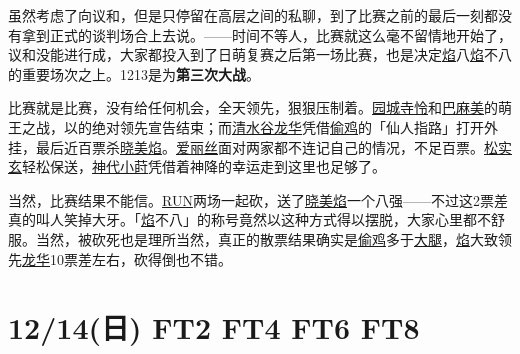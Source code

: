 
虽然考虑了向议和，但是只停留在高层之间的私聊，到了比赛之前的最后一刻都没有拿到正式的谈判场合上去说。——时间不等人，比赛就这么毫不留情地开始了，议和没能进行成，大家都投入到了日萌复赛之后第一场比赛，也是决定\uline{焰}八\uline{焰}不八的重要场次之上。1213是为\textbf{第三次大战}。

比赛就是比赛，没有给任何机会，全天领先，狠狠压制着。\uline{园城寺怜}和\uline{巴麻美}的萌王之战，以的绝对领先宣告结束；而\uline{清水谷龙华}凭借\uline{偷鸡}的「仙人指路」打开外挂，最后近百票杀\uline{晓美焰}。\uline{爱丽丝}面对两家都不连记自己的情况，不足百票。\uline{松实玄}轻松保送，\uline{神代小莳}凭借着神降的幸运走到这里也足够了。

当然，比赛结果不能信。\uline{RUN}两场一起砍，送了\uline{晓美焰}一个八强——不过这2票差真的叫人笑掉大牙。「\uline{焰}不八」的称号竟然以这种方式得以摆脱，大家心里都不舒服。当然，被砍死也是理所当然，真正的散票结果确实是\uline{偷鸡}多于\uline{大腿}，\uline{焰}大致领先\uline{龙华}10票差左右，砍得倒也不错。

\section{12/14(日) FT2 FT4 FT6 FT8}


